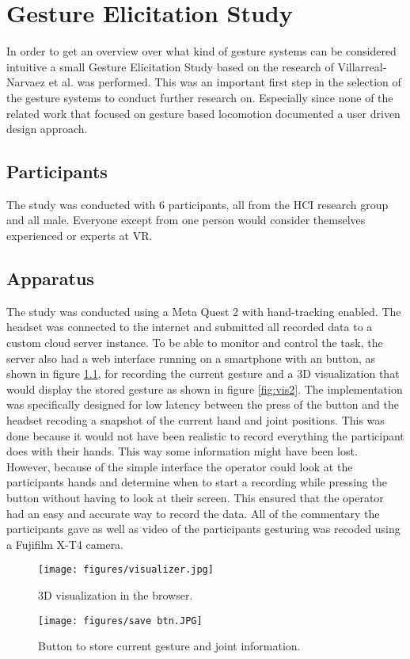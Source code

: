 \chapter{Gesture Elicitation Study}
In order to get an overview over what kind of gesture systems can be considered intuitive a small Gesture Elicitation Study based on the research of Villarreal-Narvaez et al. \cite{elicitation} was performed. This was an important first step in the selection of the gesture systems to conduct further research on. Especially since none of the related work that focused on gesture based locomotion documented a user driven design approach.

\section{Participants}
The study was conducted with 6 participants, all from the HCI research group and all male. Everyone except from one person would consider themselves experienced or experts at VR.

\section{Apparatus}
The study was conducted using a Meta Quest 2 with hand-tracking enabled. The headset was connected to the internet and submitted all recorded data to a custom cloud server instance. To be able to monitor and control the task, the server also had a web interface running on a smartphone with an button, as shown in figure \ref{fig:savebtn}, for recording the current gesture and a 3D visualization that would display the stored gesture as shown in figure \ref{fig:vis2}. The implementation was specifically designed for low latency between the press of the button and the headset recoding a snapshot of the current hand and joint positions. This was done because it would not have been realistic to record everything the participant does with their hands. This way some information might have been lost. However, because of the simple interface the operator could look at the participants hands and determine when to start a recording while pressing the button without having to look at their screen. This ensured that the operator had an easy and accurate way to record the data. All of the commentary the participants gave as well as video of the participants gesturing was recoded using a Fujifilm X-T4 camera. 

\begin{figure}[!htb]
        \texttt{[image: figures/visualizer.jpg]}
        \caption{3D visualization in the browser.}
        \label{fig:vis2}
    \endminipage\hfill
        \texttt{[image: figures/save btn.JPG]}
        \caption{Button to store current gesture and joint information.}
        \label{fig:savebtn}
    \endminipage\hfill
\end{figure}

